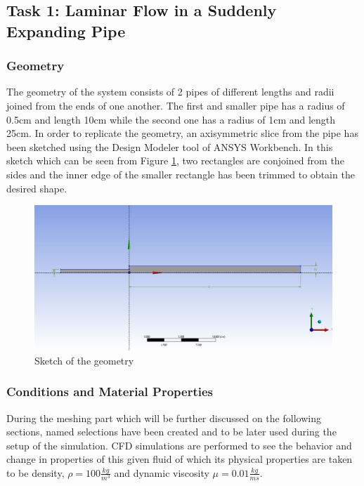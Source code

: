 \begin{task1}

\subsection{Task 1: Laminar Flow in a Suddenly Expanding Pipe}

\subsubsection{Geometry}
The geometry of the system consists of 2 pipes of different lengths and radii joined from the ends of one another. The first and smaller pipe has a radius of 0.5cm and length 10cm while the second one has a radius of 1cm and length 25cm. In order to replicate the geometry, an axisymmetric slice from the pipe has been sketched using the Design Modeler tool of ANSYS Workbench. In this sketch which can be seen from Figure \ref{fig:sketch}, two rectangles are conjoined from the sides and the inner edge of the smaller rectangle has been trimmed to obtain the desired shape.\\

\begin{figure}[h]
    \centering
    \includegraphics[width=14cm]{images/task1/sketch.png}
    \caption{Sketch of the geometry}
    \label{fig:sketch}
\end{figure}

\subsubsection{Conditions and Material Properties}
During the meshing part which will be further discussed on the following sections, named selections 
have been created and to be later used during the setup of the simulation.
CFD simulations are performed to see the behavior and change in properties of this given fluid of which its physical properties are taken to be density, $\rho = 100 \frac{kg}{m^{3}}$ and dynamic viscosity $\mu = 0.01 \frac{kg}{ms}. $\\


\end{task1}

